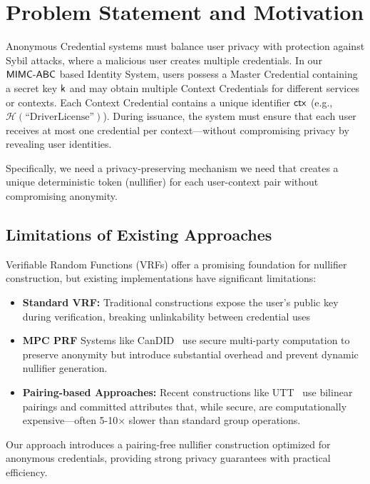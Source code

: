 
\section{Problem Statement and Motivation}
Anonymous Credential systems must balance user privacy with protection against Sybil attacks, where a malicious user creates multiple credentials. In our $\mathsf{MIMC\text{-}ABC}$ based Identity System, users possess a Master Credential containing a secret key $\mathsf{k}$ and may obtain multiple Context Credentials for different services or contexts. Each Context Credential contains a unique identifier $\mathsf{ctx}$ (e.g., $\mathcal{H}(\text{``DriverLicense''})$). During issuance, the system must ensure that each user receives at most one credential per context—without compromising privacy by revealing user identities.

Specifically, we need a privacy-preserving mechanism we need that creates a unique deterministic token (nullifier) for each user-context pair without compromising anonymity.

\subsection{Limitations of Existing Approaches}

Verifiable Random Functions (VRFs) offer a promising foundation for nullifier construction, but existing implementations have significant limitations:

\begin{itemize}
    \item \textbf{Standard VRF:} Traditional constructions expose the user's public key during verification, breaking unlinkability between credential uses~\cite{hutchison_verifiable_2005}

    \item \textbf{MPC PRF} Systems like CanDID~\cite{maram2021candid} use secure multi-party computation to preserve anonymity but introduce substantial overhead and prevent dynamic nullifier generation.

    \item \textbf{Pairing-based Approaches:} Recent constructions like UTT~\cite{tomescu2022utt} use bilinear pairings and committed attributes that, while secure, are computationally expensive—often 5-10× slower than standard group operations.
\end{itemize}

Our approach introduces a pairing-free nullifier construction optimized for anonymous credentials, providing strong privacy guarantees with practical efficiency.


